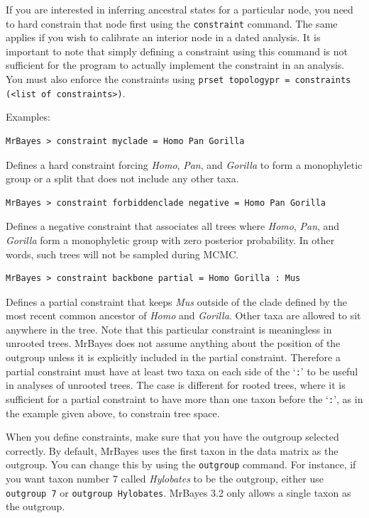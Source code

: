\documentclass[12pt]{book}
\begin{document}
If you are interested in inferring ancestral states for a particular node, you need to hard
constrain that node first using the \texttt{constraint} command. The same applies if you wish to
calibrate an interior node in a dated analysis. It is important to note that simply defining a
constraint using this command is not sufficient for the program to actually implement the
constraint in an analysis. You must also enforce the constraints using \texttt{prset topologypr =
constraints (<list of constraints>)}.

Examples:

\begin{Verbatim}
MrBayes > constraint myclade = Homo Pan Gorilla
\end{Verbatim}

Defines a hard constraint forcing \textit{Homo}, \textit{Pan}, and \textit{Gorilla} to form a
monophyletic group or a split that does not include any other taxa.

\begin{Verbatim}
MrBayes > constraint forbiddenclade negative = Homo Pan Gorilla
\end{Verbatim}

Defines a negative constraint that associates all trees where \textit{Homo}, \textit{Pan}, and
\textit{Gorilla} form a monophyletic group with zero posterior probability. In other words, such
trees will not be sampled during MCMC.

\begin{Verbatim}
MrBayes > constraint backbone partial = Homo Gorilla : Mus
\end{Verbatim}

Defines a partial constraint that keeps \textit{Mus} outside of the clade defined by the most
recent common ancestor of \textit{Homo} and \textit{Gorilla}. Other taxa are allowed to sit
anywhere in the tree. Note that this particular constraint is meaningless in unrooted trees.
MrBayes does not assume anything about the position of the outgroup unless it is explicitly
included in the partial constraint. Therefore a partial constraint must have at least two taxa on
each side of the `\texttt{:}' to be useful in analyses of unrooted trees. The case is different for
rooted trees, where it is sufficient for a partial constraint to have more than one taxon before
the `\texttt{:}', as in the example given above, to constrain tree space.

When you define constraints, make sure that you have the outgroup selected correctly. By default,
MrBayes uses the first taxon in the data matrix as the outgroup. You can change this by using the
\texttt{outgroup} command. For instance, if you want taxon number 7 called \textit{Hylobates} to be
the outgroup, either use \texttt{outgroup 7} or \texttt{outgroup Hylobates}. MrBayes 3.2 only
allows a single taxon as the outgroup.
\end{document}
